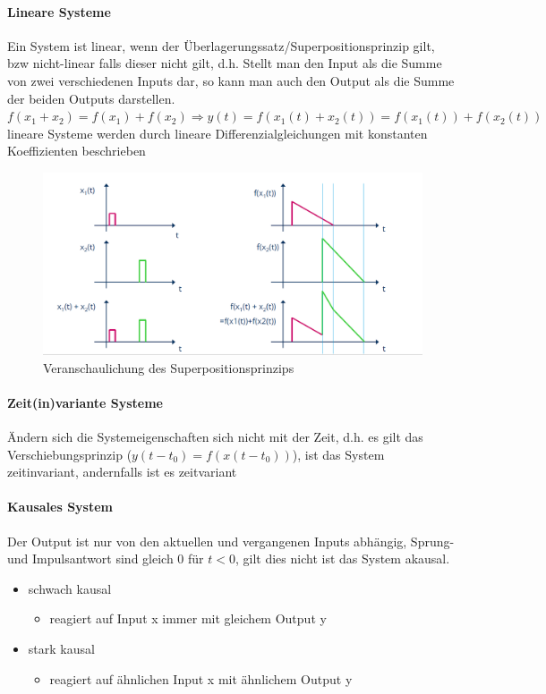 \documentclass[12pt,a4paper]{article}
\begin{document}
\paragraph{Lineare Systeme}
Ein System ist linear, wenn der Überlagerungssatz/Superpositionsprinzip gilt, bzw nicht-linear falls dieser nicht gilt, d.h. Stellt man den Input als die Summe von zwei verschiedenen Inputs dar, so kann man auch den Output als die Summe der beiden Outputs darstellen.\\
$f(x_1 + x_2) = f(x_1) + f(x_2) \Rightarrow y(t) = f(x_1(t) + x_2(t)) = f(x_1(t)) + f(x_2(t))$\\
lineare Systeme werden durch lineare Differenzialgleichungen mit konstanten Koeffizienten beschrieben
\begin{figure}[H]
\includegraphics[scale=0.3]{./resources/linear-system.png}
\caption{Veranschaulichung des Superpositionsprinzips}
\end{figure}

\paragraph{Zeit(in)variante Systeme}
Ändern sich die Systemeigenschaften sich nicht mit der Zeit, d.h. es gilt das Verschiebungsprinzip ($y(t-t_0) = f(x(t-t_0))$), ist das System zeitinvariant, andernfalls ist es zeitvariant

\paragraph{Kausales System}
Der Output ist nur von den aktuellen und vergangenen Inputs abhängig, Sprung- und Impulsantwort sind gleich 0 für $t < 0$, gilt dies nicht ist das System akausal.
\begin{itemize}
\item schwach kausal
\begin{itemize}
\item reagiert auf Input x immer mit gleichem Output y
\end{itemize}
\item stark kausal
\begin{itemize}
\item reagiert auf ähnlichen Input x mit ähnlichem Output y
\end{itemize}
\end{itemize}
\end{document}
